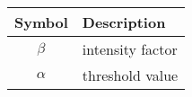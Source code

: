 \begin{table} [h]
\begin{tabular}{c l}
		\hline
		\textbf{Symbol} & \textbf{Description}  \\
		\hline
		$\beta$ & intensity factor\\ 
		$\alpha$ & threshold value\\
		\hline
	\end{tabular}
\end{table} 